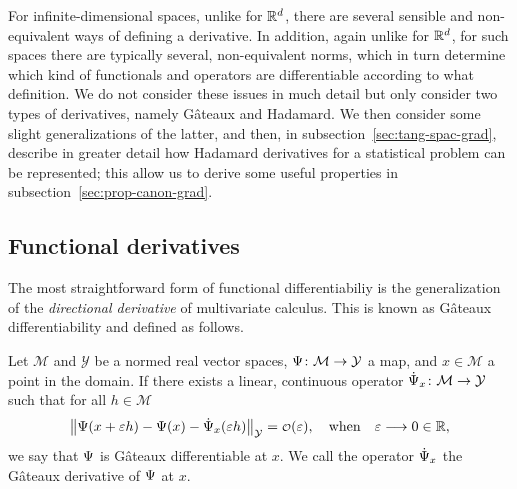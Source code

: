 \documentclass[a4,danish]{article}
\begin{document}
For infinite-dimensional spaces, unlike for $\mathbb{R}^d$, there are several sensible and non-equivalent
ways of defining a derivative. In addition, again unlike for $\mathbb{R}^d$, for such spaces there are
typically several, non-equivalent norms, which in turn determine which kind of functionals and
operators are differentiable according to what definition. We do not consider these issues in much
detail but only consider two types of derivatives, namely Gâteaux and Hadamard. We then consider
some slight generalizations of the latter, and then, in subsection~\ref{sec:tang-spac-grad},
describe in greater detail how Hadamard derivatives for a statistical problem can be represented;
this allow us to derive some useful properties in subsection~\ref{sec:prop-canon-grad}.

\subsection{Functional derivatives}
\label{sec:funct-deriv}

The most straightforward form of functional differentiabiliy is the generalization of the
\textit{directional derivative} of multivariate calculus. This is known as Gâteaux differentiability
and defined as follows.

\begin{definition}
  Let $\mathcal{M}$ and $\mathcal{Y}$ be a normed real vector spaces,
  $\operatorname{\Psi} \colon \mathcal{M} \rightarrow \mathcal{Y}$ a map, and $x \in \mathcal{M}$ a point in the
  domain. If there exists a linear, continuous operator
  $\dot{\operatorname{\Psi}}_x \colon \mathcal{M} \rightarrow \mathcal{Y} $ such that for all $h \in \mathcal{M}$
  \begin{equation*}
    \left\Vert
      \TT(x + \epsilon h) - \TT(x) - \dot{\TT}_x(\epsilon h)
    \right\Vert_{\mathcal{Y}} = \smallO(\epsilon),
    \quad \text{when} \quad \epsilon \longrightarrow 0 \in \R,
  \end{equation*}
  we say that $\operatorname{\Psi}$ is Gâteaux differentiable at $x$. We call the operator $\dot{\operatorname{\Psi}}_x$ the
  Gâteaux derivative of $\operatorname{\Psi}$ at $x$.
\end{definition}
\end{document}
